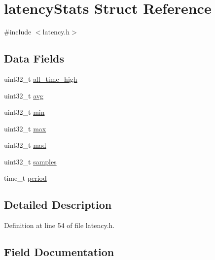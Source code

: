 \hypertarget{structlatency_stats}{}\section{latency\+Stats Struct Reference}
\label{structlatency_stats}


{\ttfamily \#include $<$latency.\+h$>$}

\subsection*{Data Fields}
\begin{DoxyCompactItemize}
\item 
uint32\+\_\+t \hyperlink{structlatency_stats_a00a8b2b1acfd9f3dd8c0100ed5457045}{all\+\_\+time\+\_\+high}
\item 
uint32\+\_\+t \hyperlink{structlatency_stats_ae71a157cc52be7c78ac77c8dfef9199b}{avg}
\item 
uint32\+\_\+t \hyperlink{structlatency_stats_a0de4531998c77245b8866f2ba909d0fa}{min}
\item 
uint32\+\_\+t \hyperlink{structlatency_stats_a43e74ba18dc1a237d9f7737ce8df350e}{max}
\item 
uint32\+\_\+t \hyperlink{structlatency_stats_a17d080f02e54aa9e8e0d58e5c8a14d1a}{mad}
\item 
uint32\+\_\+t \hyperlink{structlatency_stats_a7d9d22b1c0ac2b68b57d12ec96f54b79}{samples}
\item 
time\+\_\+t \hyperlink{structlatency_stats_a831ec502008ebff1a36b504a8360dafc}{period}
\end{DoxyCompactItemize}


\subsection{Detailed Description}


Definition at line 54 of file latency.\+h.



\subsection{Field Documentation}
\mbox{\label{structlatency_stats_a00a8b2b1acfd9f3dd8c0100ed5457045}} 
